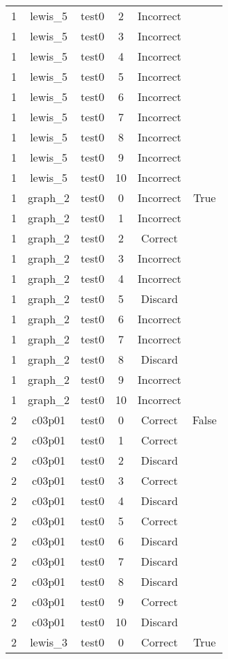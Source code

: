 \begin{longtable}{|c|c|c|c|c|c|}
1 & lewis\_5 & test0 & 2 & Incorrect &  \\ 
1 & lewis\_5 & test0 & 3 & Incorrect &  \\ 
1 & lewis\_5 & test0 & 4 & Incorrect &  \\ 
1 & lewis\_5 & test0 & 5 & Incorrect &  \\ 
1 & lewis\_5 & test0 & 6 & Incorrect &  \\ 
1 & lewis\_5 & test0 & 7 & Incorrect &  \\ 
1 & lewis\_5 & test0 & 8 & Incorrect &  \\ 
1 & lewis\_5 & test0 & 9 & Incorrect &  \\ 
1 & lewis\_5 & test0 & 10 & Incorrect &  \\ 
1 & graph\_2 & test0 & 0 & Incorrect & True \\ 
1 & graph\_2 & test0 & 1 & Incorrect &  \\ 
1 & graph\_2 & test0 & 2 & Correct &  \\ 
1 & graph\_2 & test0 & 3 & Incorrect &  \\ 
1 & graph\_2 & test0 & 4 & Incorrect &  \\ 
1 & graph\_2 & test0 & 5 & Discard &  \\ 
1 & graph\_2 & test0 & 6 & Incorrect &  \\ 
1 & graph\_2 & test0 & 7 & Incorrect &  \\ 
1 & graph\_2 & test0 & 8 & Discard &  \\ 
1 & graph\_2 & test0 & 9 & Incorrect &  \\ 
1 & graph\_2 & test0 & 10 & Incorrect &  \\ 
2 & c03p01 & test0 & 0 & Correct & False \\ 
2 & c03p01 & test0 & 1 & Correct &  \\ 
2 & c03p01 & test0 & 2 & Discard &  \\ 
2 & c03p01 & test0 & 3 & Correct &  \\ 
2 & c03p01 & test0 & 4 & Discard &  \\ 
2 & c03p01 & test0 & 5 & Correct &  \\ 
2 & c03p01 & test0 & 6 & Discard &  \\ 
2 & c03p01 & test0 & 7 & Discard &  \\ 
2 & c03p01 & test0 & 8 & Discard &  \\ 
2 & c03p01 & test0 & 9 & Correct &  \\ 
2 & c03p01 & test0 & 10 & Discard &  \\ 
2 & lewis\_3 & test0 & 0 & Correct & True \\ 

\end{longtable}
